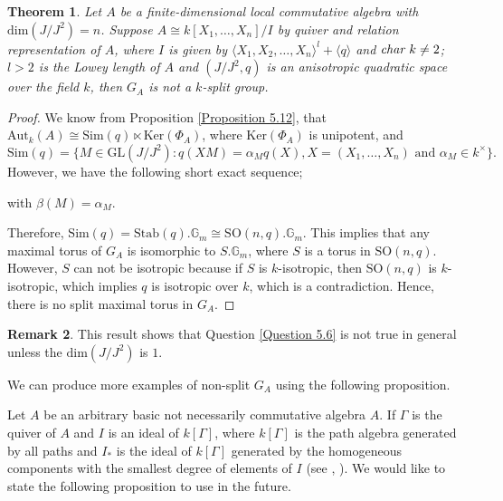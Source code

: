 \documentclass[12pt]{amsart}
\newtheorem{theorem}{Theorem}[section]
\theoremstyle{definition}
\newtheorem{remark}[theorem]{Remark}
\numberwithin{equation}{section}
\begin{document}
\vskip4mm
\begin{theorem}\label{Theorem 5.16}
Let $A$ be a finite-dimensional local commutative algebra with $\text{dim}(J/J^2)=n$. Suppose $A\cong k[X_1,\dots, X_n]/I$ by quiver and relation representation of $A$, where $I$ is given by $\langle X_1, X_2,\dots, X_n\rangle^l+\langle q\rangle$ and $\emph{char }k\neq2$; $l>2$ is the Lowey length of $A$ and $(J/J^2,q)$ is an anisotropic quadratic space over the field $k$, then $G_A$ is not a $k$-split group.
\end{theorem}
\vskip1mm
\begin{proof}
We know from Proposition \ref{Proposition 5.12}, that $\text{Aut}_k(A)\cong \text{Sim}(q)\ltimes \text{Ker}(\Phi_A)$, where $\text{Ker}(\Phi_A)$ is unipotent, and \[\text{Sim}(q)=\{M\in \text{GL}(J/J^2):q(XM)=\alpha_M q(X), X=(X_1,\dots, X_n)\text{ and }\alpha_M\in k^{\times}\}.\] However, we have the following short exact sequence;
\begin{center}
 with $\beta(M)=\alpha_M$.
\end{center}
Therefore, $\text{Sim}(q)= \text{Stab}(q).\mathbb{G}_m\cong \text{SO}(n,q).\mathbb{G}_m$. This implies that any maximal torus of $G_{A}$ is isomorphic to $S.\mathbb{G}_m$, where $S$ is a torus in $\text{SO}(n,q)$. However, $S$ can not be isotropic because if $S$ is $k$-isotropic, then $\text{SO}(n,q)$ is $k$-isotropic, which implies $q$ is isotropic over $k$, which is a contradiction. Hence, there is no split maximal torus in $G_{A}$.
\end{proof}

\vskip2mm

\begin{remark}\label{Remark 5.17}
This result shows that Question \ref{Question 5.6} is not true in general unless the $\text{dim}(J/J^2)$ is $1$.    
\end{remark}

\vskip2mm
\noindent
We can produce more examples of non-split $G_A$ using the following proposition.

\vskip4mm
\noindent
Let $A$ be an arbitrary basic not necessarily commutative algebra $A$. If $\Gamma$ is the quiver of $A$ and $I$ is an ideal of $k[\Gamma]$, where $k[\Gamma]$ is the path algebra generated by all paths and $I_{*}$ is the ideal of $k[\Gamma]$ generated by the homogeneous components with the smallest degree of elements of $I$ (see \cite{AS1}, \cite{AS2}). We would like to state the following proposition to use in the future.
\end{document}
